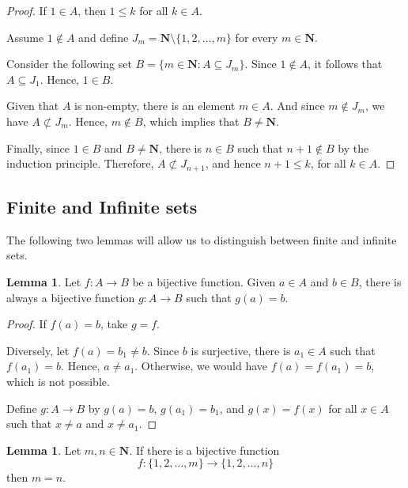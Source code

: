 \documentclass[12pt,a4paper]{article}
\theoremstyle{definition}
\newtheorem{lemma}[theorem]{Lemma}
\begin{document}
\begin{proof}
	If $1 \in A$, then $1 \leq k$ for all $k \in A$.
	
	Assume $1 \notin A$ and define $J_m = \textbf{N} \setminus \{1,2,\ldots, m\}$ for every $m \in \textbf{N}$.
	
	Consider the following set $B = \{ m \in \textbf{N} : A \subseteq J_m \}$. Since $1 \notin A$, it follows that $A \subseteq J_1$. Hence, $1 \in B$. 
	
	Given that $A$ is non-empty, there is an element $m \in A$. And since $m \notin J_m$, we have $A \not\subset J_m$. Hence, $m \notin B$, which implies that $B \neq \textbf{N}$. 
	
	Finally, since $1 \in B$ and $B \neq \textbf{N}$, there is $n \in B$ such that $n+1 \notin B$ by the induction principle. Therefore, $A \not\subset J_{n+1}$, and hence $n+1 \leq k$, for all $k \in A$.
\end{proof}

\subsection{Finite and Infinite sets}

The following two lemmas will allow us to distinguish between finite and infinite sets.

\begin{lemma}\label{two-bij-fun}
	Let $f:A \longrightarrow B$ be a bijective function. Given $a \in A$ and $b \in B$, there is always a bijective function $g : A \longrightarrow B$ such that $g(a) = b$.
\end{lemma}

\begin{proof}
	If $f(a)=b$, take $g = f$. 
	
	Diversely, let $f(a) = b_1 \neq b$. Since $b$ is surjective, there is $a_1 \in A$ such that $f(a_1) = b$. Hence, $a \neq a_1$. Otherwise, we would have $f(a) = f(a_1) = b$, which is not possible.
	
	Define $g : A \longrightarrow B$ by $g(a) = b$, $g(a_1) = b_1$, and $g(x) = f(x)$ for all $x \in A$ such that $x \neq a$ and $x \neq a_1$.
\end{proof}

\begin{lemma}\label{snd-lemma}
	Let $m,n \in \textbf{N}$. If there is a bijective function 
	\[
		f : \{ 1, 2, \ldots, m \} \longrightarrow \{ 1, 2, \ldots, n \}
	\]
	then $m=n$.
\end{lemma}
\end{document}
